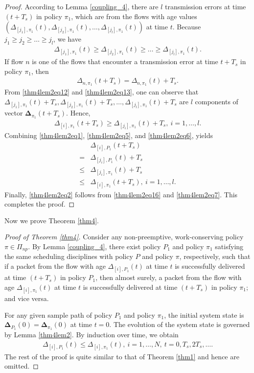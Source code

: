 \begin{proof}
According to Lemma \ref{coupling_4}, there are $l$ transmission errors at time $(t+T_s)$ in policy $\pi_1$, which are from the flows with age values $(\Delta_{[j_1],\pi_1}(t),\Delta_{[j_2],\pi_1}(t),\ldots,\Delta_{[j_{l}],\pi_1}(t))$ at time $t$. Because $j_1\geq j_2\geq \ldots \geq j_l$, we have
 \begin{align}
 \Delta_{[j_1],\pi_1}(t) \geq \Delta_{[j_2],\pi_1}(t)\geq\ldots\geq\Delta_{[j_{l}],\pi_1}(t). \label{thm4lem2eq12}
\end{align} 
If flow $n$ is one of the flows that encounter a transmission error at time $t+T_s$ in policy $\pi_1$, then
\begin{align}
\Delta_{n,\pi_1}(t+T_s) = \Delta_{n,\pi_1}(t) +T_s. \label{thm4lem2eq13}
\end{align}
From \eqref{thm4lem2eq12} and \eqref{thm4lem2eq13}, one can observe that $\Delta_{[j_1],\pi_1}(t)+T_s,\Delta_{[j_2],\pi_1}(t)+T_s,\ldots,\Delta_{[j_{l}],\pi_1}(t)+T_s$ are $l$ components of vector $\bm\Delta_{\pi_1}(t+T_s)$. Hence, 
\begin{align}
\Delta_{[i],\pi_1}(t+T_s) \geq \Delta_{[j_i],\pi_1}(t) +T_s, ~i=1,\ldots,l. \label{thm4lem2eq6}
\end{align}
Combining \eqref{thm4lem2eq1}, \eqref{thm4lem2eq5}, and \eqref{thm4lem2eq6}, yields
\begin{align}
&\Delta_{[i],P_1}(t+T_s) \nonumber\\
= &\Delta_{[j_i],P_1}(t) +T_s  \nonumber\\
\leq &\Delta_{[j_i],\pi_1}(t) +T_s \nonumber\\
\leq & \Delta_{[i],\pi_1}(t+T_s), ~i=1,\ldots,l. \label{thm4lem2eq7}
\end{align}
Finally, \eqref{thm4lem2eq2} follows from \eqref{thm4lem2eq16} and \eqref{thm4lem2eq7}. This completes the proof. 
\end{proof}


Now we  prove Theorem \ref{thm4}.
\begin{proof}[Proof of Theorem \ref{thm4}]
Consider any non-preemptive, work-conserving policy $\pi\in\Pi_{np}$. By Lemma \ref{coupling_4}, there exist policy $P_1$ and policy $\pi_1$
satisfying the same scheduling disciplines with policy $P$ and policy $\pi$, respectively, such that if a packet from the flow with age $\Delta_{[i],P_1}(t)$ at time $t$ is successfully delivered  at time $(t + T_s)$ in policy $P_1$, then almost surely, a packet from the flow with age $\Delta_{[i],\pi_1}(t)$ at time $t$ is successfully delivered  at time $(t+ T_s)$ in policy $\pi_1$; and vice versa.

For any given sample path of policy $P_1$ and policy $\pi_1$, the initial system state is $\bm\Delta_{P_1}(0) = \bm\Delta_{\pi_1}(0)$ at time $t=0$. The evolution of the system state is governed by  Lemma \ref{thm4lem2}. By induction over time, we obtain
\begin{align}\label{eq_thm4_proof1}
\Delta_{[i],P_1} (t) \leq \Delta_{[i],\pi_1} (t),~i=1,\ldots,N,~t = 0, T_s, 2T_s,\ldots.
\end{align}
The rest of the proof is quite similar to that of Theorem \ref{thm1} and hence are omitted. 
\end{proof}



\fi